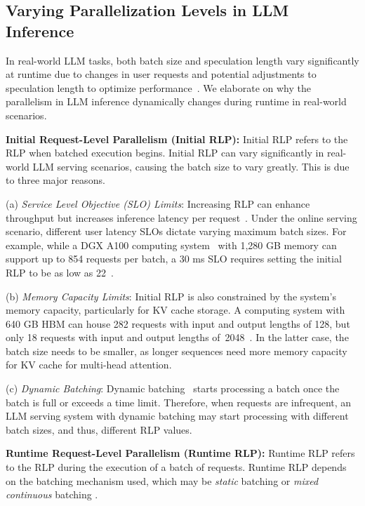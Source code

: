 \subsection{Varying Parallelization Levels in LLM Inference}
\label{sec:3.2}


In real-world LLM tasks, both batch size and speculation length vary significantly at runtime due to changes in user requests and potential adjustments to speculation length to optimize performance~\cite{mamou2024accelerating}. 
We elaborate on why the parallelism in LLM inference dynamically changes during runtime in real-world scenarios.

\noindent\textbf{Initial Request-Level Parallelism (Initial RLP):}
Initial RLP refers to the RLP when batched execution begins. Initial RLP can vary significantly in real-world LLM serving scenarios, causing the batch size to vary greatly. This is due to three major reasons.


\noindent(a) \emph{Service Level Objective (SLO) Limits}: Increasing RLP can enhance throughput but increases inference latency per request~\cite{li2023alpaserve}. Under the online serving scenario, different user latency SLOs dictate varying maximum batch sizes. For example, while a DGX A100 computing system~\cite{DGX} with 1,280 GB memory can support up to 854 requests per batch, a 30 ms SLO requires setting the initial RLP to be as low as 22~\cite{park2024attacc}.


\noindent(b) \emph{Memory Capacity Limits}: Initial RLP is also constrained by the system's memory capacity, particularly for KV cache storage. A computing system with 640 GB HBM can house 282 requests with input and output lengths of 128, but only 18 requests with input and output lengths of~2048~\cite{park2024attacc}. In the latter case, the batch size needs to be smaller, as longer sequences need more memory capacity for KV cache for multi-head attention.

\noindent(c) \emph{Dynamic Batching}: Dynamic batching~\cite{Triton} starts processing a batch once the batch is full or exceeds a time limit. Therefore, when requests are infrequent, an LLM serving system with dynamic batching may start processing with different batch sizes, and thus, different RLP values.

\noindent\textbf{Runtime Request-Level Parallelism (Runtime RLP):}
Runtime RLP refers to the RLP during the execution of a batch of requests. Runtime RLP depends on the batching mechanism used, which may be \emph{static} batching or \emph{mixed continuous} batching \cite{patel2024splitwise}. 

